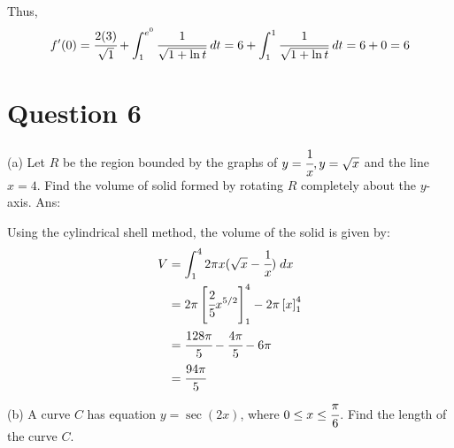 \documentclass{article}
\begin{document}
Thus,
$$f'(0) = \cfrac{2(3)}{\sqrt{1}} + \displaystyle\int_1^{e^{0}} \cfrac{1}{\sqrt{1+\ln t}} \; dt = 6 +\displaystyle\int_1^{1} \cfrac{1}{\sqrt{1+\ln t}} \; dt  = 6 + 0 = 6$$


\newpage
\section*{Question 6}
(a) Let $R$ be the region bounded by the graphs of $y = \cfrac{1}{x}, y = \sqrt{x}$ and the line $x = 4$. Find the
volume of solid formed by rotating $R$ completely about the $y$-axis. 
\newline
\newline
Ans:
\newline
\begin{center}
\end{center}
\newline
Using the cylindrical shell method, the volume of the solid is given by:
\begin{align*}
    V 
    &= \displaystyle\int_{1}^4 2 \pi x(\sqrt{x} - \cfrac{1}{x}) \; dx \\
    &= 2\pi \left[\cfrac{2}{5}x^{5/2}\right]_1^4 - 2\pi\left[x\right]_1^4 \\
    &= \cfrac{128 \pi}{5}- \cfrac{4 \pi}{5} - 6 \pi \\
    &= \cfrac{94\pi}{5}
\end{align*}
\newline
\newline
(b) A curve $C$ has equation $y = \sec (2x)$, where $0 \leq x \leq \cfrac{\pi}{6}$. Find the length of the curve $C$.
\end{document}
